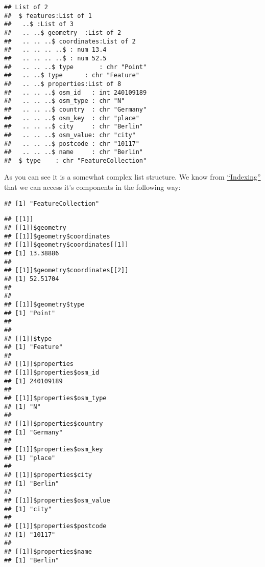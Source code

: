 \documentclass[]{book}
\newenvironment{Shaded}{\begin{snugshade}}{\end{snugshade}}
\newcommand{\NormalTok}[1]{#1}
\newcommand{\OperatorTok}[1]{\textcolor[rgb]{0.81,0.36,0.00}{\textbf{#1}}}
\begin{document}
\begin{verbatim}
## List of 2
##  $ features:List of 1
##   ..$ :List of 3
##   .. ..$ geometry  :List of 2
##   .. .. ..$ coordinates:List of 2
##   .. .. .. ..$ : num 13.4
##   .. .. .. ..$ : num 52.5
##   .. .. ..$ type       : chr "Point"
##   .. ..$ type      : chr "Feature"
##   .. ..$ properties:List of 8
##   .. .. ..$ osm_id   : int 240109189
##   .. .. ..$ osm_type : chr "N"
##   .. .. ..$ country  : chr "Germany"
##   .. .. ..$ osm_key  : chr "place"
##   .. .. ..$ city     : chr "Berlin"
##   .. .. ..$ osm_value: chr "city"
##   .. .. ..$ postcode : chr "10117"
##   .. .. ..$ name     : chr "Berlin"
##  $ type    : chr "FeatureCollection"
\end{verbatim}

As you can see it is a somewhat complex list structure.
We know from \protect\hyperlink{indexing}{``Indexing''} that we can access it's components in the following way:

\begin{Shaded}
\end{Shaded}

\begin{verbatim}
## [1] "FeatureCollection"
\end{verbatim}

\begin{Shaded}
\end{Shaded}

\begin{verbatim}
## [[1]]
## [[1]]$geometry
## [[1]]$geometry$coordinates
## [[1]]$geometry$coordinates[[1]]
## [1] 13.38886
## 
## [[1]]$geometry$coordinates[[2]]
## [1] 52.51704
## 
## 
## [[1]]$geometry$type
## [1] "Point"
## 
## 
## [[1]]$type
## [1] "Feature"
## 
## [[1]]$properties
## [[1]]$properties$osm_id
## [1] 240109189
## 
## [[1]]$properties$osm_type
## [1] "N"
## 
## [[1]]$properties$country
## [1] "Germany"
## 
## [[1]]$properties$osm_key
## [1] "place"
## 
## [[1]]$properties$city
## [1] "Berlin"
## 
## [[1]]$properties$osm_value
## [1] "city"
## 
## [[1]]$properties$postcode
## [1] "10117"
## 
## [[1]]$properties$name
## [1] "Berlin"
\end{verbatim}
\end{document}
